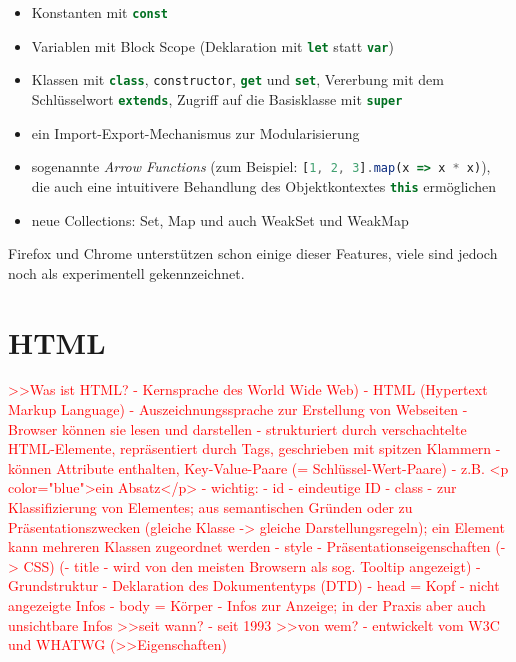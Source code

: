 \documentclass[a4paper, 12pt, hidelinks, listof=totoc, listoftables=totoc, bibliography=totoc]{scrreprt}
\newcommand{\js}[1]{\lstinline[language=JavaScript, style=inline]|#1|}
\newcommand{\TODO}[1]{\textcolor{red}{#1}\newline}
\begin{document}
\begin{itemize}
\item Konstanten mit \js{const}
\item Variablen mit Block Scope (Deklaration mit \js{let} statt \js{var})
\item Klassen mit \js{class}, \js{constructor}, \js{get} und \js{set}, Vererbung mit dem Schlüsselwort \js{extends}, Zugriff auf die Basisklasse mit \js{super}
\item ein Import-Export-Mechanismus zur Modularisierung
\item sogenannte \emph{Arrow Functions} (zum Beispiel: \js{[1, 2, 3].map(x => x * x)}), die auch eine intuitivere Behandlung des Objektkontextes \js{this} ermöglichen
\item neue Collections: Set, Map und auch WeakSet und WeakMap
\end{itemize}

Firefox und Chrome unterstützen schon einige dieser Features, viele sind jedoch noch als experimentell gekennzeichnet.


\section{HTML}


\TODO{>>Was ist \ac{HTML}?
	- Kernsprache des World Wide Web)
	- \ac{HTML} (Hypertext Markup Language)
	- Auszeichnungssprache zur Erstellung von Webseiten
	- Browser können sie lesen und darstellen
	- strukturiert durch verschachtelte HTML-Elemente, repräsentiert durch Tags, geschrieben mit spitzen Klammern
		- können Attribute enthalten, Key-Value-Paare (= Schlüssel-Wert-Paare)
		- z.B. <p color="blue">ein Absatz</p>
		- wichtig:
			- id - eindeutige ID
			- class - zur Klassifizierung von Elementes; aus semantischen Gründen oder zu Präsentationszwecken (gleiche Klasse -> gleiche Darstellungsregeln); ein Element kann mehreren Klassen zugeordnet werden
			- style - Präsentationseigenschaften (-> CSS)
			(- title - wird von den meisten Browsern als sog. Tooltip angezeigt)
	- Grundstruktur
		- Deklaration des Dokumententyps (DTD)
		- head = Kopf - nicht angezeigte Infos
		- body = Körper - Infos zur Anzeige; in der Praxis aber auch unsichtbare Infos
}
\TODO{>>seit wann?
	- seit 1993}
\TODO{>>von wem?
	- entwickelt vom W3C und WHATWG}
\TODO{(>>Eigenschaften)}
\end{document}
